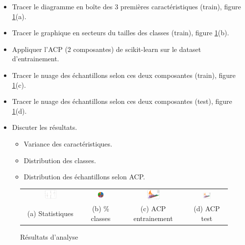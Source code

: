 \documentclass[12pt, a4paper]{article}
\begin{document}
\begin{itemize}
	\item Tracer le diagramme en boîte des 3 premières caractéristiques (train), figure \ref{res-analyse}(a).
	\item Tracer le graphique en secteurs du tailles des classes (train), figure \ref{res-analyse}(b).
	\item Appliquer l'ACP (2 composantes) de scikit-learn sur le dataset d'entrainement.
	\item Tracer le nuage des échantillons selon ces deux composantes (train), figure \ref{res-analyse}(c).
	\item Tracer le nuage des échantillons selon ces deux composantes (test), figure \ref{res-analyse}(d).
	\item Discuter les résultats.
	\begin{itemize}
		\item Variance des caractéristiques.
		\item Distribution des classes.
		\item Distribution des échantillons selon ACP.
	\end{itemize}
\end{itemize}

\begin{figure}[ht]
	\centering
	\begin{tabular}{cccc}
		\includegraphics[width=0.22\textwidth]{../img/workshop/stat.png} &
		\includegraphics[width=0.22\textwidth]{../img/workshop/cls.png} &
		\includegraphics[width=0.22\textwidth]{../img/workshop/pca.train.png} &
		\includegraphics[width=0.22\textwidth]{../img/workshop/pca.test.png} \\
		(a) Statistiques &
		(b) \% classes  &
		(c) ACP entrainement &
		(d) ACP test \\
	\end{tabular}
	\caption{Résultats d'analyse}
	\label{res-analyse}
\end{figure}
\end{document}
